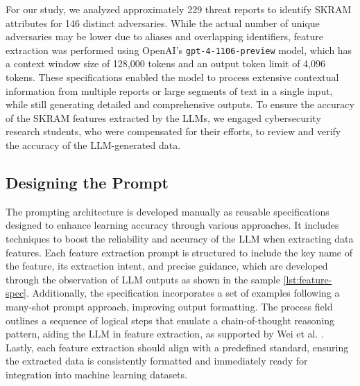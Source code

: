 \documentclass[running heads]{llncs}
\begin{document}

For our study, we analyzed approximately 229 threat reports to identify SKRAM attributes for 146 distinct adversaries. While the actual number of unique adversaries may be lower due to aliases and overlapping identifiers, feature extraction was performed using OpenAI's \texttt{gpt-4-1106-preview} model, which has a context window size of 128,000 tokens and an output token limit of 4,096 tokens. These specifications enabled the model to process extensive contextual information from multiple reports or large segments of text in a single input, while still generating detailed and comprehensive outputs. To ensure the accuracy of the SKRAM features extracted by the LLMs, we engaged cybersecurity research students, who were compensated for their efforts, to review and verify the accuracy of the LLM-generated data.

\subsection{Designing the Prompt}
The prompting architecture is developed manually as reusable specifications designed to enhance learning accuracy through various approaches. It includes techniques to boost the reliability and accuracy of the LLM when extracting data features. Each feature extraction prompt is structured to include the key name of the feature, its extraction intent, and precise guidance, which are developed through the observation of LLM outputs as shown in the sample \ref{lst:feature-spec}. Additionally, the specification incorporates a set of examples following a many-shot prompt approach, improving output formatting. The process field outlines a sequence of logical steps that emulate a chain-of-thought reasoning pattern, aiding the LLM in feature extraction, as supported by Wei et al. \cite{wei2022chain}. Lastly, each feature extraction should align with a predefined standard, ensuring the extracted data is consistently formatted and immediately ready for integration into machine learning datasets.
\end{document}
